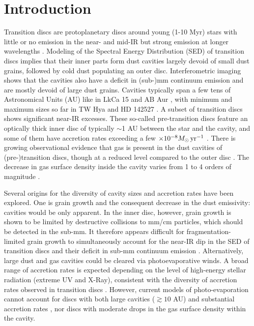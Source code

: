 \documentclass[a4paper,usenatbib]{mnras}
\begin{document}
\section{Introduction}
\label{sec:intro}
Transition discs are protoplanetary discs around young (1-10 Myr)
stars with little or no emission in the near- and mid-IR but strong
emission at longer wavelengths \citep[see the review
by][]{Espaillat14}. Modeling of the Spectral Energy Distribution (SED)
of transition discs implies that their inner parts form dust cavities
largely devoid of small dust grains, followed by cold dust populating
an outer disc. Interferometric imaging shows that the cavities also
have a deficit in (sub-)mm continuum emission and are mostly devoid of
large dust grains. Cavities typically span a few tens of Astronomical
Units (AU) like in LkCa 15 \citep[$\sim$50 AU;][]{Andrews11} and AB
Aur \citep[$\gtrsim$70 AU;][]{Pietu05}, with minimum and maximum sizes
so far in TW Hya \citep[$\sim$4 AU;][]{Hughes07} and HD 142527
\citep[$\sim$140 AU;][]{Casassus13,Avenhaus14}. A subset of transition
discs shows significant near-IR excesses. These so-called
pre-transition discs feature an optically thick inner disc of
typically $\sim$1 AU between the star and the cavity, and some of them
have accretion rates exceeding a few $\times 10^{-8} M_{\odot}\,{\rm
  yr}^{-1}$ \citep[][and references therein]{Espaillat14}. There is
growing observational evidence that gas is present in the dust
cavities of (pre-)transition discs, though at a reduced level compared
to the outer disc \citep{Carmona14,Bruderer14}.  The decrease in gas
surface density inside the cavity varies from 1 to 4 orders of
magnitude \citep{vanderMarel2015}.

Several origins for the diversity of cavity sizes and accretion rates
have been explored. One is grain growth and the consequent decrease in
the dust emissivity: cavities would be only apparent. In the inner
disc, however, grain growth is shown to be limited by destructive
collisions to mm/cm particles, which should be detected in the
sub-mm. It therefore appears difficult for fragmentation-limited grain
growth to simultaneously account for the near-IR dip in the SED of
transition discs and their deficit in sub-mm continuum emission
\citep{Birnstiel2012}. Alternatively, large dust and gas cavities
could be cleared via photoevaporative winds. A broad range of
accretion rates is expected depending on the level of high-energy
stellar radiation (extreme UV and X-Ray), consistent with the
diversity of accretion rates observed in transition discs \citep[see
the review by][]{AlexanderPP6}. However, current models of
photo-evaporation cannot account for discs with both large cavities
($\gtrsim 10$ AU) and substantial accretion rates \citep[$\gtrsim
10^{-9} M_{\odot}\,{\rm yr}^{-1}$;][]{Owen11}, nor discs with moderate
drops in the gas surface density within the cavity.
\end{document}
